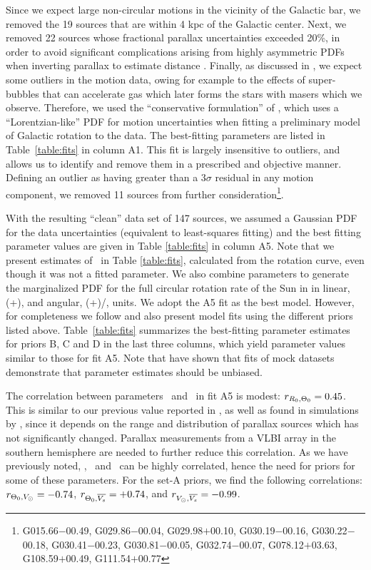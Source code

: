 \documentclass[12pt,preprint]{aastex}
\def\eg   {e.g.,~}
\def\V     {\ifmmode {V_\odot}\else {$V_\odot$}\fi}
\def\Vsbar {\ifmmode {\overline{V_s}}\else {$\overline{V_s}$}\fi}
\def\To    {\ifmmode{\Theta_0}\else{$\Theta_0$}\fi}
\def\Ro    {\ifmmode{R_0}\else{$R_0$}\fi}
\begin{document}
Since we expect large non-circular motions in the vicinity of the Galactic bar,
we removed the 19 sources that are within 4 kpc of the Galactic center.
Next, we removed 22 sources whose fractional parallax uncertainties exceeded 20\%,
in order to avoid significant complications arising from highly asymmetric
PDFs when inverting parallax to estimate distance \citep[\eg][]{Bailer-Jones:15}{}.
Finally, as discussed in \citet{Reid:14}, we expect some outliers in the 
motion data, owing for example to the effects of super-bubbles that can accelerate
gas which later forms the stars with masers which we observe.   
Therefore, we used the ``conservative formulation'' of \citet{Sivia:06}, 
which uses a ``Lorentzian-like'' PDF for motion uncertainties when fitting a 
preliminary model of Galactic rotation to the data.  The best-fitting parameters are 
listed in Table~\ref{table:fits} in column A1.  This fit is largely insensitive to 
outliers, and allows us to identify and remove them in a prescribed and objective 
manner. Defining an outlier as having greater than a $3\sigma$ residual in any
motion component, we removed 11 sources from further consideration\footnote{
G015.66$-$00.49, G029.86$-$00.04, G029.98$+$00.10, G030.19$-$00.16, G030.22$-$00.18,
G030.41$-$00.23, G030.81$-$00.05, G032.74$-$00.07, G078.12$+$03.63, G108.59$+$00.49,
G111.54$+$00.77}. 

With the resulting ``clean'' data set of 147 sources, we assumed a Gaussian
PDF for the data uncertainties (equivalent to least-squares fitting) and
the best fitting parameter values are given in Table \ref{table:fits}
in column A5.  Note that we present estimates of \To\ in Table \ref{table:fits},
calculated from the rotation curve, even though it was not a fitted parameter.
We also combine parameters to generate the marginalized PDF for the full circular 
rotation rate of the Sun in in linear, (\To+\V), and angular, (\To+\V)/\Ro, units.  
We adopt the A5 fit as the best model.  However, for completeness we follow 
\citet{Reid:14} and also present model fits using the different priors listed
above.  Table~\ref{table:fits} summarizes the best-fitting parameter estimates for
priors B, C and D in the last three columns, which yield parameter values similar to 
those for fit A5. Note that \citet{Nunez:17} have shown that fits of mock datasets  
demonstrate that parameter estimates should be unbiased.

The correlation between parameters \Ro\ and \To\ in fit A5 is modest: 
$r_{\Ro,\To}=0.45$.  This is similar to our previous value reported in \citet{Reid:14},
as well as found in simulations by \citet{Nunez:17},
since it depends on the range and distribution of parallax sources which has not
significantly changed.   Parallax measurements from a VLBI array in the southern 
hemisphere are needed to further reduce this correlation.  As we have previously
noted, \To, \V\ and \Vsbar\ can be highly correlated, hence the need for 
priors for some of these parameters.  For the set-A priors, we find the
following correlations: $r_{\To,\V}=-0.74$, $r_{\To,\Vsbar}=+0.74$, and
$r_{\V,\Vsbar}=-0.99$.   
\end{document}
